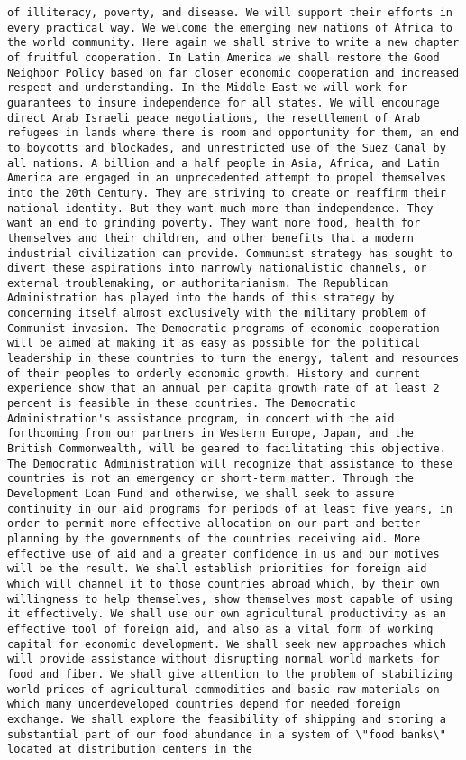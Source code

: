 \documentclass[
]{article}
\begin{document}
\begin{verbatim}
of illiteracy, poverty, and disease. We will support their efforts in every practical way. We welcome the emerging new nations of Africa to the world community. Here again we shall strive to write a new chapter of fruitful cooperation. In Latin America we shall restore the Good Neighbor Policy based on far closer economic cooperation and increased respect and understanding. In the Middle East we will work for guarantees to insure independence for all states. We will encourage direct Arab Israeli peace negotiations, the resettlement of Arab refugees in lands where there is room and opportunity for them, an end to boycotts and blockades, and unrestricted use of the Suez Canal by all nations. A billion and a half people in Asia, Africa, and Latin America are engaged in an unprecedented attempt to propel themselves into the 20th Century. They are striving to create or reaffirm their national identity. But they want much more than independence. They want an end to grinding poverty. They want more food, health for themselves and their children, and other benefits that a modern industrial civilization can provide. Communist strategy has sought to divert these aspirations into narrowly nationalistic channels, or external troublemaking, or authoritarianism. The Republican Administration has played into the hands of this strategy by concerning itself almost exclusively with the military problem of Communist invasion. The Democratic programs of economic cooperation will be aimed at making it as easy as possible for the political leadership in these countries to turn the energy, talent and resources of their peoples to orderly economic growth. History and current experience show that an annual per capita growth rate of at least 2 percent is feasible in these countries. The Democratic Administration's assistance program, in concert with the aid forthcoming from our partners in Western Europe, Japan, and the British Commonwealth, will be geared to facilitating this objective. The Democratic Administration will recognize that assistance to these countries is not an emergency or short-term matter. Through the Development Loan Fund and otherwise, we shall seek to assure continuity in our aid programs for periods of at least five years, in order to permit more effective allocation on our part and better planning by the governments of the countries receiving aid. More effective use of aid and a greater confidence in us and our motives will be the result. We shall establish priorities for foreign aid which will channel it to those countries abroad which, by their own willingness to help themselves, show themselves most capable of using it effectively. We shall use our own agricultural productivity as an effective tool of foreign aid, and also as a vital form of working capital for economic development. We shall seek new approaches which will provide assistance without disrupting normal world markets for food and fiber. We shall give attention to the problem of stabilizing world prices of agricultural commodities and basic raw materials on which many underdeveloped countries depend for needed foreign exchange. We shall explore the feasibility of shipping and storing a substantial part of our food abundance in a system of \"food banks\" located at distribution centers in the 
\end{verbatim}
\end{document}
